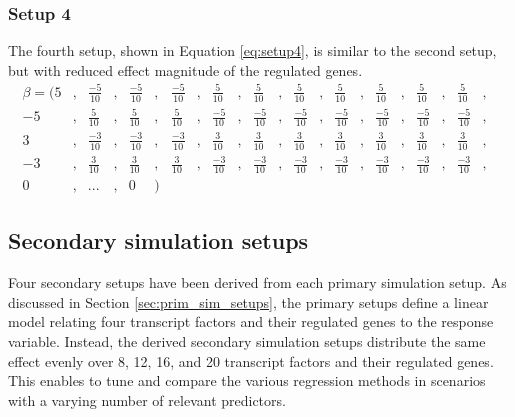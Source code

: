 \subsubsection{Setup 4}
The fourth setup, shown in Equation \ref{eq:setup4}, is similar to the second setup, but with reduced effect magnitude of the regulated genes. 
\begin{equation} \label{eq:setup4} 
\begin{aligned}
\beta = (	5&,& \frac{-5}{10}&,&  \frac{-5}{10}&,&  \frac{-5}{10}&,&  \frac{5}{10}&,&  \frac{5}{10}&,&  \frac{5}{10}&,&  \frac{5}{10}&,&  \frac{5}{10}&,&  \frac{5}{10}&,&  \frac{5}{10}&,& \\
-5&,& \frac{5}{10}&,&  \frac{5}{10}&,&  \frac{5}{10}&,&  \frac{-5}{10}&,&  \frac{-5}{10}&,&  \frac{-5}{10}&,&  \frac{-5}{10}&,&  \frac{-5}{10}&,&  \frac{-5}{10}&,&  \frac{-5}{10}&,& \\
3&,& \frac{-3}{10}&,&  \frac{-3}{10}&,&  \frac{-3}{10}&,&  \frac{3}{10}&,&  \frac{3}{10}&,&  \frac{3}{10}&,&  \frac{3}{10}&,&  \frac{3}{10}&,&  \frac{3}{10}&,&  \frac{3}{10}&,& \\
-3&,& \frac{3}{10}&,&  \frac{3}{10}&,&  \frac{3}{10}&,&  \frac{-3}{10}&,&  \frac{-3}{10}&,&  \frac{-3}{10}&,&  \frac{-3}{10}&,&  \frac{-3}{10}&,&  \frac{-3}{10}&,&  \frac{-3}{10}&,& \\
0&,& ...&,& 0&)&
\end{aligned}
\end{equation}


\subsection{Secondary simulation setups} \label{sec:sec_sim_set}
Four secondary setups have been derived from each primary simulation setup. As discussed in Section \ref{sec:prim_sim_setups}, the primary setups define a linear model relating four transcript factors and their regulated genes to the response variable. Instead, the derived secondary simulation setups distribute the same effect evenly over 8, 12, 16, and 20 transcript factors and their regulated genes. This enables to tune and compare the various regression methods in scenarios with a varying number of relevant predictors.